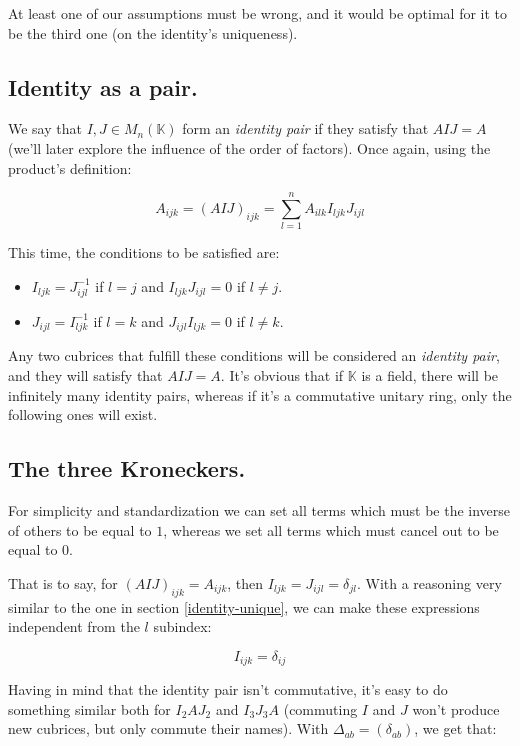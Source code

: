 At least one of our assumptions must be wrong, and it would be optimal for it to be the third one (on the identity's uniqueness).

\subsection{Identity as a pair.} \label{identity-pair}

We say that $I, J \in M_{n} (\mathbb{K})$ form an \textit{identity pair} if they satisfy that $AIJ = A$ (we'll later explore the influence of the order of factors). Once again, using the product's definition:

$$A_{ijk} = (AIJ)_{ijk} = \sum\limits_{l=1}^{n} A_{ilk} I_{ljk} J_{ijl}$$

This time, the conditions to be satisfied are:

\begin{itemize}
	\item $I_{ljk} = J_{ijl}^{-1}$ if $l = j$ and $I_{ljk} J_{ijl} = 0$ if $l \neq j$.
	\item $J_{ijl} = I_{ljk}^{-1}$ if $l = k$ and $J_{ijl} I_{ljk} = 0$ if $l \neq k$.
\end{itemize}

Any two cubrices that fulfill these conditions will be considered an \textit{identity pair}, and they will satisfy that $AIJ = A$. It's obvious that if $\mathbb{K}$ is a field, there will be infinitely many identity pairs, whereas if it's a commutative unitary ring, only the following ones will exist.

\subsection{The three Kroneckers.} \label{identity-kronecker}

For simplicity and standardization we can set all terms which must be the inverse of others to be equal to $1$, whereas we set all terms which must cancel out to be equal to $0$.

That is to say, for $(AIJ)_{ijk} = A_{ijk}$, then $I_{ljk} = J_{ijl} = \delta_{jl}$. With a reasoning very similar to the one in section \ref{identity-unique}, we can make these expressions independent from the $l$ subindex:

$$I_{ijk} = \delta_{ij}$$

Having in mind that the identity pair isn't commutative, it's easy to do something similar both for $I_2 A J_2$ and $I_3 J_3 A$ (commuting $I$ and $J$ won't produce new cubrices, but only commute their names). With $\Delta_{ab} = (\delta_{ab})$, we get that:

